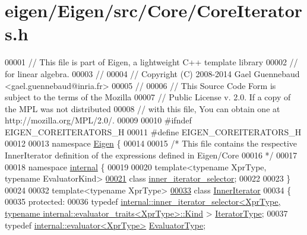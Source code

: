 \hypertarget{eigen_2_eigen_2src_2_core_2_core_iterators_8h_source}{}\section{eigen/\+Eigen/src/\+Core/\+Core\+Iterators.h}
\label{eigen_2_eigen_2src_2_core_2_core_iterators_8h_source}

\begin{DoxyCode}
00001 \textcolor{comment}{// This file is part of Eigen, a lightweight C++ template library}
00002 \textcolor{comment}{// for linear algebra.}
00003 \textcolor{comment}{//}
00004 \textcolor{comment}{// Copyright (C) 2008-2014 Gael Guennebaud <gael.guennebaud@inria.fr>}
00005 \textcolor{comment}{//}
00006 \textcolor{comment}{// This Source Code Form is subject to the terms of the Mozilla}
00007 \textcolor{comment}{// Public License v. 2.0. If a copy of the MPL was not distributed}
00008 \textcolor{comment}{// with this file, You can obtain one at http://mozilla.org/MPL/2.0/.}
00009 
00010 \textcolor{preprocessor}{#ifndef EIGEN\_COREITERATORS\_H}
00011 \textcolor{preprocessor}{#define EIGEN\_COREITERATORS\_H}
00012 
00013 \textcolor{keyword}{namespace }\hyperlink{namespace_eigen}{Eigen} \{ 
00014 
00015 \textcolor{comment}{/* This file contains the respective InnerIterator definition of the expressions defined in Eigen/Core}
00016 \textcolor{comment}{ */}
00017 
00018 \textcolor{keyword}{namespace }\hyperlink{namespaceinternal}{internal} \{
00019 
00020 \textcolor{keyword}{template}<\textcolor{keyword}{typename} XprType, \textcolor{keyword}{typename} EvaluatorKind>
\hyperlink{class_eigen_1_1internal_1_1inner__iterator__selector}{00021} \textcolor{keyword}{class }\hyperlink{class_eigen_1_1internal_1_1inner__iterator__selector}{inner\_iterator\_selector};
00022 
00023 \}
00024 
00032 \textcolor{keyword}{template}<\textcolor{keyword}{typename} XprType>
\hyperlink{class_eigen_1_1_inner_iterator}{00033} \textcolor{keyword}{class }\hyperlink{class_eigen_1_1_inner_iterator}{InnerIterator}
00034 \{
00035 \textcolor{keyword}{protected}:
00036   \textcolor{keyword}{typedef} 
      \hyperlink{class_eigen_1_1internal_1_1inner__iterator__selector}{internal::inner\_iterator\_selector<XprType, typename internal::evaluator\_traits<XprType>::Kind}
      > \hyperlink{class_eigen_1_1internal_1_1inner__iterator__selector}{IteratorType};
00037   \textcolor{keyword}{typedef} \hyperlink{struct_eigen_1_1internal_1_1evaluator}{internal::evaluator<XprType>} \hyperlink{struct_eigen_1_1internal_1_1evaluator}{EvaluatorType};

\end{DoxyCode}
